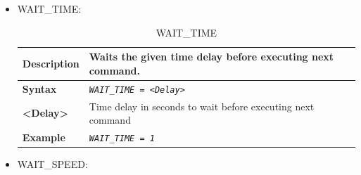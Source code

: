 \documentclass{template/openetcs}
\begin{document}
\begin{itemize}
\begin{longtable}{|l|l|}
			\hline \hline
				
		\end{longtable}
	
	\item WAIT\_TIME:				
		
		\begin{longtable}{|l|l|}
		\caption{WAIT\_TIME}\\ 
				
			\hline						
				
				\begin{minipage}[t]{0.22\linewidth} \textbf{Description} \end{minipage} 
			&	\begin{minipage}[t]{0.78\linewidth} Waits the given time delay before executing next command. \end{minipage} \\
						
			\hline
									
				\begin{minipage}[t]{0.22\linewidth} \textbf{Syntax}	\end{minipage}
			&	\begin{minipage}[t]{0.78\linewidth} \emph{\texttt{WAIT\_TIME = <Delay>}} \end{minipage} \\
			
			\hline
			
				\begin{minipage}[t]{0.22\linewidth} \textbf{<Delay>} \end{minipage}
			&	\begin{minipage}[t]{0.78\linewidth} Time delay in seconds to wait before executing next command \end{minipage} \\
			
			\hline
				
				\begin{minipage}[t]{0.22\linewidth} \textbf{Example} \end{minipage}
			&	\begin{minipage}[t]{0.78\linewidth}	\emph{\texttt{WAIT\_TIME = 1}} \end{minipage} \\
			
			\hline \hline
			
		\end{longtable}
		
	\item WAIT\_SPEED:
									

\end{itemize}
\end{document}
